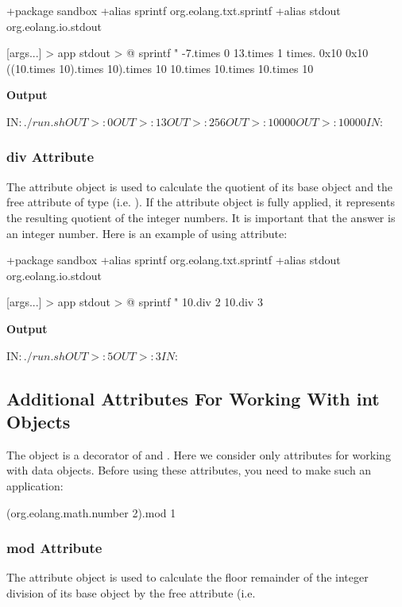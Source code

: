 \documentclass[12pt]{book}
\begin{document}
{\begin{ffcode}
+package sandbox
+alias sprintf org.eolang.txt.sprintf
+alias stdout org.eolang.io.stdout

[args...] > app
  stdout > @
    sprintf
      "%
      -7.times 0
      13.times 1
      times.
        0x10
        0x10
      ((10.times 10).times 10).times 10
      10.times 10.times 10.times 10

\end{ffcode}
\textbf{Output}
\begin{ffcode}

IN$: ./run.sh
OUT>: 0
OUT>: 13
OUT>: 256
OUT>: 10000
OUT>: 10000
IN$: 
\end{ffcode}

\subsubsection{div Attribute}
The  attribute object is used to calculate the quotient of its base  object and the free attribute  of type  (i.e. ).
If the  attribute object is fully applied, it represents the resulting quotient of the integer numbers. It is important that the answer is an integer number. Here is an example of using  attribute:

\begin{ffcode}
+package sandbox
+alias sprintf org.eolang.txt.sprintf
+alias stdout org.eolang.io.stdout

[args...] > app
  stdout > @
    sprintf
      "%
      10.div 2
      10.div 3
\end{ffcode}
\textbf{Output}
\begin{ffcode}
IN$: ./run.sh
OUT>: 5
OUT>: 3
IN$: 
\end{ffcode}

\subsection{Additional Attributes For Working With int Objects}
The object  is a decorator of  and . Here we consider only attributes for working with  data objects. Before using these attributes, you need to make such an application:
\begin{ffcode}
(org.eolang.math.number 2).mod 1
\end{ffcode}

\subsubsection{mod Attribute}
The  attribute object is used to calculate the floor remainder of the integer division of its base  object by the  free attribute (i.e. \ff{$ %
If the \ff{mod} attribute object is fully applied, it represents the resulting floor modulus (remainder).
The modulus for \ff{x = 0} is undefined. The resulting floor modulus has the same sign as the divisor \ff{x}.
The relationship between the \ff{mod} and \ff{div} operations is as follows:
\ff{(x / y) * y + x %

}}}
\end{document}
